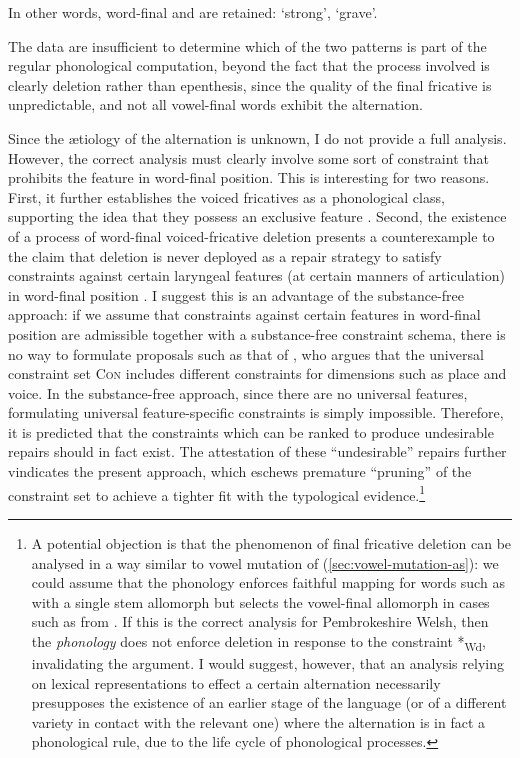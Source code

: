 In other words, word-final \ipa{[v]} and \ipa{[ð]} are retained: \ipa{[ˈkriːv]} `strong', \ipa{[ˈbeːð]} `grave'.

The data are insufficient to determine which of the two patterns is part of the regular phonological computation, beyond the fact that the process involved is clearly deletion rather than epenthesis, since the quality of the final fricative is unpredictable, and not all vowel-final words exhibit the alternation.

Since the ætiology of the alternation is unknown, I do not provide a full analysis. However, the correct analysis must clearly involve some sort of constraint that prohibits the feature  in word-final position. This is interesting for two reasons. First, it further establishes the voiced fricatives as a phonological class, supporting the idea that they possess an exclusive feature \citep[\cfm][]{mielke-diss}. Second, the existence of a process of word-final voiced\hyp fricative deletion presents a counterexample to the claim \citep{lombardi01:_why_place_voice,steriade01} that deletion is never deployed as a repair strategy to satisfy constraints against certain laryngeal features (at certain manners of articulation) in word-final position \citep[\cf also][]{flynn07:_too}. I suggest this is an advantage of the substance-free approach: if we assume that constraints against certain features in word-final position are admissible  together with a substance-free constraint schema, there is no way to formulate proposals such as that of \citet{lombardi01:_why_place_voice}, who argues that the universal constraint set \textsc{Con} includes different constraints for dimensions such as place and voice. In the substance-free approach, since there are no universal features, formulating universal feature\hyp specific constraints is simply impossible. Therefore, it is predicted that the constraints which can be ranked to produce undesirable repairs should in fact exist. The attestation of these \enquote{undesirable} repairs further vindicates the present approach, which eschews premature \enquote{pruning} of the constraint set to achieve a tighter fit with the typological evidence.\footnote{A potential objection is that the phenomenon of final fricative deletion can be analysed in a way similar to vowel mutation of \ipa{[u]} (\cref{sec:vowel-mutation-as}): we could assume that the phonology enforces faithful mapping for words such as \ipa{[ˈpriːð]} with a single stem allomorph but selects the vowel\hyp final allomorph in cases such as \ipa{[ˈtreː]} from . If this is the correct analysis for Pembrokeshire Welsh, then the \emph{phonology} does not enforce deletion in response to the constraint *\textrbracket\textsubscript{Wd}, invalidating the argument. I would suggest, however, that an analysis relying on lexical representations to effect a certain alternation necessarily presupposes the existence of an earlier stage of the language (or of a different variety in contact with the relevant one) where the alternation is in fact a phonological rule, due to the life cycle of phonological processes.}

